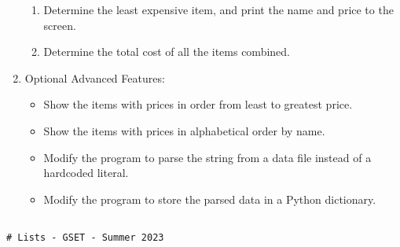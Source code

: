\documentclass[12pt]{article}
\begin{document}
\begin{description}[labelindent=1cm]
\begin{enumerate}
\begin{enumerate}
	      \item Determine the least expensive item, and print the name and price to the screen.\\

	      \item Determine the total cost of all the items combined. \\

		\end{enumerate}	

	\item Optional Advanced Features:
		\begin{itemize}
			
			\item Show the items with prices in order from least to greatest price.\\

			\item Show the items with prices in alphabetical order by name.\\	

			\item Modify the program to parse the string from a data file instead of a hardcoded literal.\\

			\item Modify the program to store the parsed data in a Python dictionary.\\		


		    
		\end{itemize}	

	\end{enumerate}
\newpage

\item[\textbf{\underline{Example Code:}}] \hfill \vspace{0mm}

	\begin{lstlisting}

# Lists - GSET - Summer 2023 
	

	
	\end{lstlisting}
		


	\item[\textbf{\underline{Part 3 - Testing:}}] \hfill \vspace{0mm}
	\begin{enumerate}
	

\end{enumerate}
\end{description}
\end{document}
